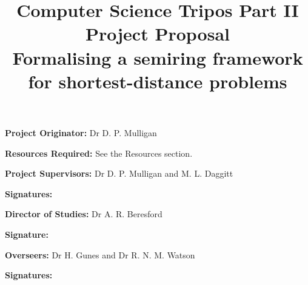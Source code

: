 \title{{\large Computer Science Tripos Part II Project Proposal} \\ Formalising a semiring framework for shortest-distance problems}
\thispagestyle{empty}

\medskip
{}
\medskip
{}

\vfil



{\let\newpage\relax\maketitle}

\vfil

{\bf Project Originator:} Dr D. P. Mulligan

\vspace{0.1in}

{\bf Resources Required:} See the Resources section.

\vspace{0.5in}

{\bf Project Supervisors:} Dr D. P. Mulligan and M. L. Daggitt

\vspace{0.2in}

{\bf Signatures:}

\vspace{0.5in}

{\bf Director of Studies:} Dr A. R. Beresford

\vspace{0.2in}

{\bf Signature:}

\vspace{0.5in}

{\bf Overseers:} Dr H. Gunes and Dr R. N. M. Watson

\vspace{0.2in}

{\bf Signatures:}

\vfil
\eject

